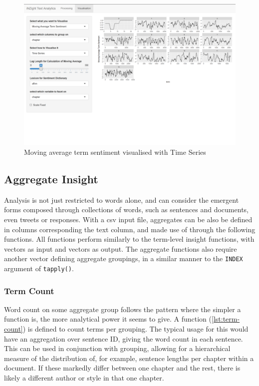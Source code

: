 \documentclass[11pt, a4paper, twoside, titlepage]{report}
\begin{document}
\begin{figure}
\centering
\includegraphics[scale=0.35]{visualisation-ma-overview.png}
\caption{Moving average term sentiment visualised with Time Series\label{fig:visualisation-ma-overview}}
\end{figure}

\subsection{Aggregate Insight}\label{sec:aggregate-insight}

Analysis is not just restricted to words alone, and can consider the
emergent forms composed through collections of words, such as
sentences and documents, even tweets or responses. With a csv input
file, aggregates can be also be defined in columns corresponding the
text column, and made use of through the following functions. All
functions perform similarly to the term-level insight functions, with
vectors as input and vectors as output. The aggregate functions also
require another vector defining aggregate groupings, in a similar
manner to the \texttt{INDEX} argument of
\texttt{tapply()}.

\subsubsection{Term Count}\label{sec:term-count}

Word count on some aggregate group follows the pattern where the
simpler a function is, the more analytical power it seems to give. A
function (\cref{lst:term-count}) is defined to count terms per
grouping. The typical usage for this would have an aggregation over
sentence ID, giving the word count in each sentence. This can be used
in conjunction with grouping, allowing for a hierarchical measure of
the distribution of, for example, sentence lengths per chapter within
a document. If these markedly differ between one chapter and the rest,
there is likely a different author or style in that one chapter.
\end{document}
